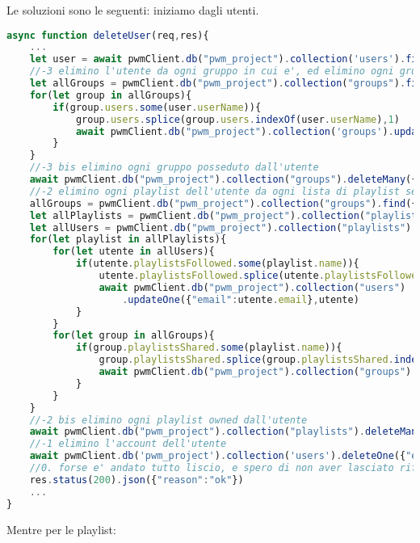 Le soluzioni sono le seguenti: iniziamo dagli utenti.
\begin{lstlisting}[language=JavaScript]
async function deleteUser(req,res){ 
    ...
    let user = await pwmClient.db("pwm_project").collection('users').findOne({"email": decoded.email})
    //-3 elimino l'utente da ogni gruppo in cui e', ed elimino ogni gruppo che sia owned, rimuovendolo prima da ogni utente che sia in quel gruppo
    let allGroups = pwmClient.db("pwm_project").collection("groups").find({})
    for(let group in allGroups){
        if(group.users.some(user.userName)){
            group.users.splice(group.users.indexOf(user.userName),1)
            await pwmClient.db("pwm_project").collection('groups').updateOne({"name":group.name},group)
        }
    }
    //-3 bis elimino ogni gruppo posseduto dall'utente
    await pwmClient.db("pwm_project").collection("groups").deleteMany({"owner":user.userName})
    //-2 elimino ogni playlist dell'utente da ogni lista di playlist seguite altrui
    allGroups = pwmClient.db("pwm_project").collection("groups").find({})
    let allPlaylists = pwmClient.db("pwm_project").collection("playlists").find({"owner":user.userName})
    let allUsers = pwmClient.db("pwm_project").collection("playlists").find({"email":{$not:decoded.email}})
    for(let playlist in allPlaylists){
        for(let utente in allUsers){
            if(utente.playlistsFollowed.some(playlist.name)){
                utente.playlistsFollowed.splice(utente.playlistsFollowed.indexOf(playlist.name),1)
                await pwmClient.db("pwm_project").collection("users")
                    .updateOne({"email":utente.email},utente)
            }
        }
        for(let group in allGroups){
            if(group.playlistsShared.some(playlist.name)){
                group.playlistsShared.splice(group.playlistsShared.indexOf(playlist.name),1)
                await pwmClient.db("pwm_project").collection("groups").updateOne({"name":group.name})
            }
        }
    }
    //-2 bis elimino ogni playlist owned dall'utente
    await pwmClient.db("pwm_project").collection("playlists").deleteMany({"owner":utente.userName})
    //-1 elimino l'account dell'utente
    await pwmClient.db('pwm_project').collection('users').deleteOne({"email":decoded.email})
    //0. forse e' andato tutto liscio, e spero di non aver lasciato riferimenti pending da qualche parte
    res.status(200).json({"reason":"ok"})
    ...
}
\end{lstlisting}
Mentre per le playlist:
